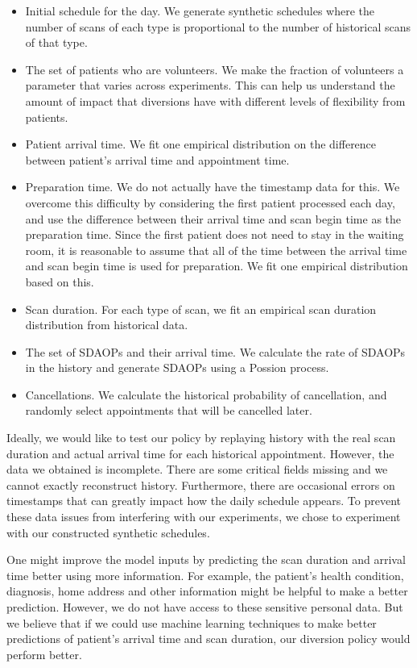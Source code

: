 \begin{itemize}
\item Initial schedule for the day. We generate synthetic schedules
  where the number of scans of each type is proportional to the
  number of historical scans of that type.
\item The set of patients who are volunteers. We make the fraction
  of volunteers a parameter that varies across experiments.
  This can help us understand the amount of impact that diversions have
  with different levels of flexibility from patients.
\item Patient arrival time. We fit one empirical distribution on
  the difference between patient's arrival time and appointment time.
\item Preparation time. We do not actually have the timestamp data for this.
  We overcome this difficulty by considering the first patient processed each day,
  and use the difference between their arrival time and scan begin time
  as the preparation time. Since the first patient does not need to stay in the
  waiting room, it is reasonable to assume that all of the time between the arrival time
  and scan begin time is used for preparation. We fit one empirical distribution
  based on this.
\item Scan duration. For each type of scan, we fit an empirical
  scan duration distribution from historical data.
\item The set of SDAOPs and their arrival time. We calculate the rate of
  SDAOPs in the history and generate SDAOPs using a Possion process.
\item Cancellations. We calculate the historical probability of cancellation,
  and randomly select appointments that will be cancelled later.
\end{itemize}
Ideally, we would like to test our policy by replaying history with the real
scan duration and actual arrival time for each historical appointment. However,
the data we obtained is incomplete. There are some critical fields missing
and we cannot exactly reconstruct history. Furthermore, there are occasional
errors on timestamps that can greatly impact how the daily schedule appears.
To prevent these data issues from interfering with our experiments, we chose
to experiment with our constructed synthetic schedules.

One might improve the model inputs by predicting the scan duration and
arrival time better using more information. For example, the patient's
health condition, diagnosis, home address and other information might be
helpful to make a better prediction. However, we do not have access to these
sensitive personal data. But we believe that if we could use machine learning
techniques to make better predictions of patient's arrival time and scan duration,
our diversion policy would perform better.

